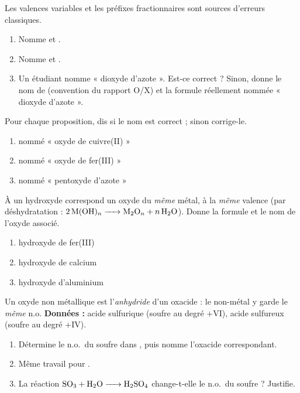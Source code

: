 \documentclass[11pt,a4paper]{article}
\begin{document}
\begin{exo}
Les valences variables et les préfixes fractionnaires sont sources d'erreurs classiques.
\begin{enumerate}[label=\alph*)]
  \item Nomme  et .
  \item Nomme  et .
  \item Un étudiant nomme  « dioxyde d'azote ». Est-ce correct ? Sinon, donne le nom de 
        (convention du rapport O/X) et la formule réellement nommée « dioxyde d'azote ».
\end{enumerate}
\end{exo}

\begin{exo}
Pour chaque proposition, dis si le nom est correct ; sinon corrige-le.
\begin{enumerate}[label=\alph*)]
  \item {} nommé « oxyde de cuivre(II) »
  \item {} nommé « oxyde de fer(III) »
  \item {} nommé « pentoxyde d'azote »
\end{enumerate}
\end{exo}

\begin{exo}
À un hydroxyde correspond un oxyde du \emph{même} métal, à la \emph{même} valence (par déshydratation :
$\ce{2 M(OH)_n -> M2O_n + $n$ H2O}$). Donne la formule et le nom de l'oxyde associé.
\begin{enumerate}[label=\alph*)]
  \item hydroxyde de fer(III) 
  \item hydroxyde de calcium 
  \item hydroxyde d'aluminium 
\end{enumerate}
\end{exo}

\begin{exo}
Un oxyde non métallique est l'\emph{anhydride} d'un oxacide : le non-métal y garde le \emph{même} n.o.
\textbf{Données :} acide sulfurique  (soufre au degré $+\mathrm{VI}$), acide sulfureux 
(soufre au degré $+\mathrm{IV}$).
\begin{enumerate}[label=\alph*)]
  \item Détermine le n.o.\ du soufre dans , puis nomme l'oxacide correspondant.
  \item Même travail pour .
  \item La réaction $\ce{SO3 + H2O -> H2SO4}$ change-t-elle le n.o.\ du soufre ? Justifie.
\end{enumerate}
\end{exo}
\end{document}
